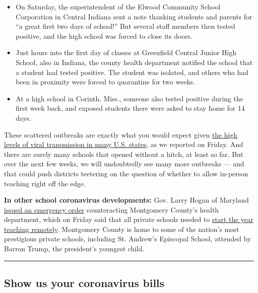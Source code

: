 \begin{itemize}
\item
  On Saturday, the superintendent of the Elwood Community School
  Corporation in Central Indiana sent a note thanking students and
  parents for ``a great first two days of school!'' But several staff
  members then tested positive, and the high school was forced to close
  its doors.
\item
  Just hours into the first day of classes at Greenfield Central Junior
  High School, also in Indiana, the county health department notified
  the school that a student had tested positive. The student was
  isolated, and others who had been in proximity were forced to
  quarantine for two weeks.
\item
  At a high school in Corinth, Miss., someone also tested positive
  during the first week back, and exposed students there were asked to
  stay home for 14 days.
\end{itemize}

These scattered outbreaks are exactly what you would expect given
\href{https://www.nytimes.com/interactive/2020/07/31/us/coronavirus-school-reopening-risk.html}{the
high levels of viral transmission in many U.S. states}, as we reported
on Friday. And there are surely many schools that opened without a
hitch, at least so far. But over the next few weeks, we will undoubtedly
see many more outbreaks --- and that could push districts teetering on
the question of whether to allow in-person teaching right off the edge.

\textbf{In other school coronavirus developments:} Gov. Larry Hogan of
Maryland
\href{https://twitter.com/GovLarryHogan/status/1290330304830246912}{issued
an emergency order} counteracting Montgomery County's health department,
which on Friday said that all private schools needed to
\href{https://www.washingtonpost.com/local/education/montgomery-county-health-officials-tell-private-schools-to-start-school-online/2020/08/01/64552b9e-d3fd-11ea-9038-af089b63ac21_story.html}{start
the year teaching remotely}. Montgomery County is home to some of the
nation's most prestigious private schools, including St. Andrew's
Episcopal School, attended by Barron Trump, the president's youngest
child.

\begin{center}\rule{0.5\linewidth}{\linethickness}\end{center}

\hypertarget{show-us-your-coronavirus-bills}{%
\subsection{Show us your coronavirus
bills}\label{show-us-your-coronavirus-bills}}

